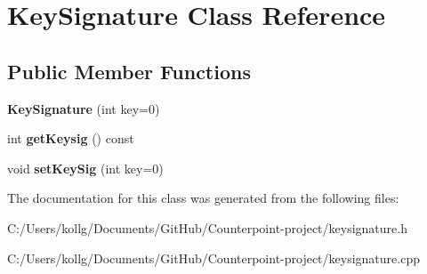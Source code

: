 \hypertarget{class_key_signature}{}\section{Key\+Signature Class Reference}
\label{class_key_signature}
\subsection*{Public Member Functions}
\begin{DoxyCompactItemize}
\item 
\hypertarget{class_key_signature_ac3749df5c4d4bd6c11a1d9ce593da546}{}{\bfseries Key\+Signature} (int key=0)\label{class_key_signature_ac3749df5c4d4bd6c11a1d9ce593da546}

\item 
\hypertarget{class_key_signature_af773264a0f75f21635d35f037d0f5a46}{}int {\bfseries get\+Keysig} () const \label{class_key_signature_af773264a0f75f21635d35f037d0f5a46}

\item 
\hypertarget{class_key_signature_aa91751b71f480eec27f3e0215d11eada}{}void {\bfseries set\+Key\+Sig} (int key=0)\label{class_key_signature_aa91751b71f480eec27f3e0215d11eada}

\end{DoxyCompactItemize}


The documentation for this class was generated from the following files\+:\begin{DoxyCompactItemize}
\item 
C\+:/\+Users/kollg/\+Documents/\+Git\+Hub/\+Counterpoint-\/project/keysignature.\+h\item 
C\+:/\+Users/kollg/\+Documents/\+Git\+Hub/\+Counterpoint-\/project/keysignature.\+cpp\end{DoxyCompactItemize}
